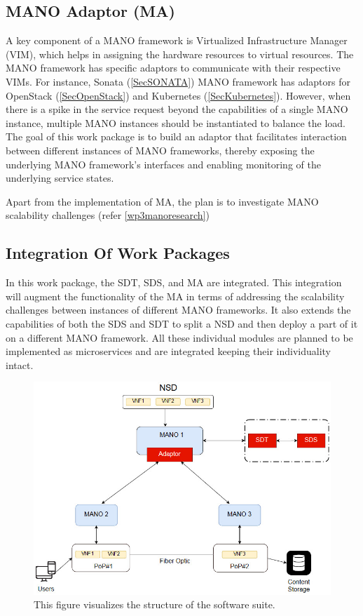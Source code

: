 \subsection{MANO Adaptor (MA)}

A key component of a MANO framework is Virtualized Infrastructure Manager (VIM),  which helps in assigning the hardware resources to virtual resources. The MANO framework has specific adaptors to communicate with their respective VIMs. For instance, Sonata  (\ref{SecSONATA}) MANO framework has adaptors for OpenStack (\ref{SecOpenStack}) and Kubernetes (\ref{SecKubernetes}). However, when there is a spike in the service request beyond the capabilities of a single MANO instance, multiple MANO instances should be instantiated to balance the load. The goal of this work package is to build an adaptor that facilitates interaction between different instances of MANO frameworks, thereby exposing the underlying MANO framework's interfaces and enabling monitoring of the underlying service states.

Apart from the implementation of MA, the plan is to investigate MANO scalability challenges (refer \ref{wp3manoresearch})

\subsection{Integration Of Work Packages}
In this work package, the SDT, SDS, and MA are integrated. This integration will augment the functionality of the MA in terms of addressing the scalability challenges between instances of different MANO frameworks. It also extends the capabilities of both the SDS and SDT to split a NSD and then deploy a part of it on a different MANO framework. All these individual modules are planned to be implemented as microservices and are integrated keeping their individuality intact. 
\begin{figure} [h]
	\centering
	\includegraphics[width=0.8\linewidth]{figures/StructureIntegrated1}
	\caption{This figure visualizes the structure of the software suite.}
	\label{fig:structureintegrated}
\end{figure}

